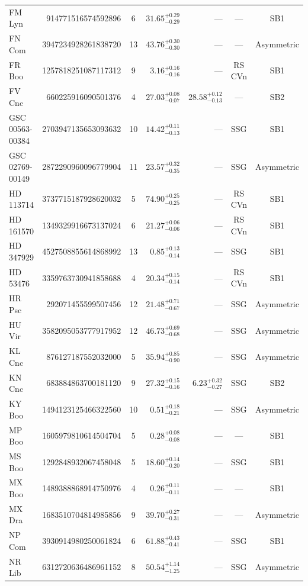 \begin{table}[htbp]
\begin{minipage}{\textwidth}
\begin{tabular}{lrcrrcc}
 FM Lyn & 914771516574592896 & 6 & $31.65^{+0.29}_{-0.29}$ & --- & --- & SB1 \\
 FN Com & 3947234928261838720 & 13 & $43.76^{+0.30}_{-0.30}$ & --- & --- & Asymmetric \\
 FR Boo & 1257818251087117312 & 9 & $3.16^{+0.16}_{-0.16}$ & --- & RS CVn & SB1 \\
 FV Cnc & 660225916090501376 & 4 & $27.03^{+0.08}_{-0.07}$ & $28.58^{+0.12}_{-0.13}$ & --- & SB2 \\
 GSC 00563-00384 & 2703947135653093632 & 10 & $14.42^{+0.11}_{-0.13}$ & --- & SSG & SB1 \\
 GSC 02769-00149 & 2872290960096779904 & 11 & $23.57^{+0.32}_{-0.35}$ & --- & SSG & Asymmetric \\
 HD 113714 & 3737715187928620032 & 5 & $74.90^{+0.25}_{-0.25}$ & --- & RS CVn & SB1 \\
 HD 161570 & 1349329916673137024 & 6 & $21.27^{+0.06}_{-0.06}$ & --- & RS CVn & SB1 \\
 HD 347929 & 4527508855614868992 & 13 & $0.85^{+0.13}_{-0.14}$ & --- & SSG & SB1 \\
 HD 53476 & 3359763730941858688 & 4 & $20.34^{+0.15}_{-0.14}$ & --- & RS CVn & SB1 \\
 HR Psc & 292071455599507456 & 12 & $21.48^{+0.71}_{-0.67}$ & --- & SSG & Asymmetric \\
 HU Vir & 3582095053777917952 & 12 & $46.73^{+0.69}_{-0.68}$ & --- & SSG & Asymmetric \\
 KL Cnc & 876127187552032000 & 5 & $35.94^{+0.85}_{-0.90}$ & --- & SSG & Asymmetric \\
 KN Cnc & 683884863700181120 & 9 & $27.32^{+0.15}_{-0.16}$ & $6.23^{+0.32}_{-0.27}$ & SSG & SB2 \\
 KY Boo & 1494123125466322560 & 10 & $0.51^{+0.18}_{-0.21}$ & --- & SSG & Asymmetric \\
 MP Boo & 1605979810614504704 & 5 & $0.28^{+0.08}_{-0.08}$ & --- & --- & SB1 \\
 MS Boo & 1292848932067458048 & 5 & $18.60^{+0.14}_{-0.20}$ & --- & SSG & SB1 \\
 MX Boo & 1489388868914750976 & 4 & $0.26^{+0.11}_{-0.11}$ & --- & --- & SB1 \\
 MX Dra & 1683510704814985856 & 9 & $39.70^{+0.27}_{-0.31}$ & --- & --- & Asymmetric \\
 NP Com & 3930914980250061824 & 6 & $61.88^{+0.43}_{-0.41}$ & --- & SSG & SB1 \\
 NR Lib & 6312720636486961152 & 8 & $50.54^{+1.14}_{-1.25}$ & --- & SSG & Asymmetric \\

\end{tabular}
\end{minipage}
\end{table}
